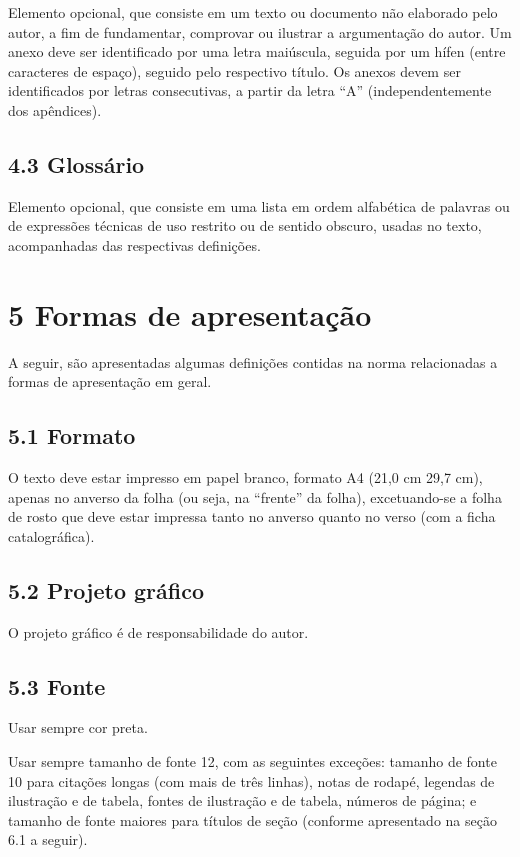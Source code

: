 \documentclass[
	12pt,				%
	oneside,			%
	a4paper,			%
	english,			%
	brazil				%
	]{abntex2ppgsi}
\begin{document}
\begin{anexosenv}
Elemento opcional, que consiste em um texto ou documento não elaborado pelo autor, a fim de fundamentar, comprovar ou ilustrar a argumentação do autor. Um anexo deve ser identificado por uma letra maiúscula, seguida por um hífen (entre caracteres de espaço), seguido pelo respectivo título. Os anexos devem ser identificados por letras consecutivas, a partir da letra ``A'' (independentemente dos apêndices).

\subsection*{4.3 Glossário}

Elemento opcional, que consiste em uma lista em ordem alfabética de palavras ou de expressões técnicas de uso restrito ou de sentido obscuro, usadas no texto, acompanhadas das respectivas definições.

\section*{5 Formas de apresentação}

A seguir, são apresentadas algumas definições contidas na norma relacionadas a formas de apresentação em geral.

\subsection*{5.1 Formato}

O texto deve estar impresso em papel branco, formato A4 (21,0 cm 29,7 cm), apenas no anverso da folha (ou seja, na ``frente'' da folha), excetuando-se a folha de rosto que deve estar impressa tanto no anverso quanto no verso (com a ficha catalográfica).

\subsection*{5.2 Projeto gráfico}

O projeto gráfico é de responsabilidade do autor.

\subsection*{5.3 Fonte}


Usar sempre cor preta.

Usar sempre tamanho de fonte 12, com as seguintes exceções: tamanho de fonte 10 para citações longas (com mais de três linhas), notas de rodapé, legendas de ilustração e de tabela, fontes de ilustração e de tabela, números de página; e tamanho de fonte maiores para títulos de seção (conforme apresentado na seção 6.1 a seguir).


\end{anexosenv}
\end{document}
